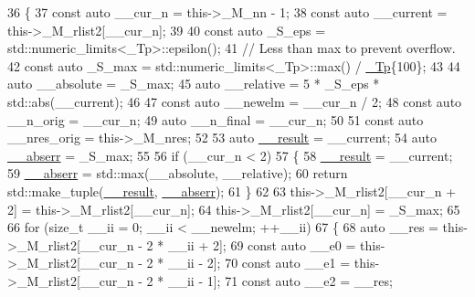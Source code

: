 \begin{DoxyCode}
36     \{
37       \textcolor{keyword}{const} \textcolor{keyword}{auto} \_\_cur\_n = this->\_M\_nn - 1;
38       \textcolor{keyword}{const} \textcolor{keyword}{auto} \_\_current = this->\_M\_rlist2[\_\_cur\_n];
39 
40       \textcolor{keyword}{const} \textcolor{keyword}{auto} \_S\_eps = std::numeric\_limits<\_Tp>::epsilon();
41       \textcolor{comment}{// Less than max to prevent overflow.}
42       \textcolor{keyword}{const} \textcolor{keyword}{auto} \_S\_max = std::numeric\_limits<\_Tp>::max() / \hyperlink{namespace____gnu__cxx_a3b19a9c800ca194374ef9172290f7d79}{\_Tp}\{100\};
43 
44       \textcolor{keyword}{auto} \_\_absolute = \_S\_max;
45       \textcolor{keyword}{auto} \_\_relative = 5 * \_S\_eps * std::abs(\_\_current);
46 
47       \textcolor{keyword}{const} \textcolor{keyword}{auto} \_\_newelm = \_\_cur\_n / 2;
48       \textcolor{keyword}{const} \textcolor{keyword}{auto} \_\_n\_orig = \_\_cur\_n;
49       \textcolor{keyword}{auto} \_\_n\_final = \_\_cur\_n;
50 
51       \textcolor{keyword}{const} \textcolor{keyword}{auto} \_\_nres\_orig = this->\_M\_nres;
52 
53       \textcolor{keyword}{auto} \hyperlink{namespace____gnu__cxx_a500ea9f53aeaecd8c2ae657503450578}{\_\_result} = \_\_current;
54       \textcolor{keyword}{auto} \hyperlink{namespace____gnu__cxx_a72f736cff127f1574e91a301de9e074b}{\_\_abserr} = \_S\_max;
55 
56       \textcolor{keywordflow}{if} (\_\_cur\_n < 2)
57         \{
58           \hyperlink{namespace____gnu__cxx_a500ea9f53aeaecd8c2ae657503450578}{\_\_result} = \_\_current;
59           \hyperlink{namespace____gnu__cxx_a72f736cff127f1574e91a301de9e074b}{\_\_abserr} = std::max(\_\_absolute, \_\_relative);
60           \textcolor{keywordflow}{return} std::make\_tuple(\hyperlink{namespace____gnu__cxx_a500ea9f53aeaecd8c2ae657503450578}{\_\_result}, \hyperlink{namespace____gnu__cxx_a72f736cff127f1574e91a301de9e074b}{\_\_abserr});
61         \}
62 
63       this->\_M\_rlist2[\_\_cur\_n + 2] = this->\_M\_rlist2[\_\_cur\_n];
64       this->\_M\_rlist2[\_\_cur\_n] = \_S\_max;
65 
66       \textcolor{keywordflow}{for} (\textcolor{keywordtype}{size\_t} \_\_ii = 0; \_\_ii < \_\_newelm; ++\_\_ii)
67         \{
68           \textcolor{keyword}{auto} \_\_res = this->\_M\_rlist2[\_\_cur\_n - 2 * \_\_ii + 2];
69           \textcolor{keyword}{const} \textcolor{keyword}{auto} \_\_e0 = this->\_M\_rlist2[\_\_cur\_n - 2 * \_\_ii - 2];
70           \textcolor{keyword}{const} \textcolor{keyword}{auto} \_\_e1 = this->\_M\_rlist2[\_\_cur\_n - 2 * \_\_ii - 1];
71           \textcolor{keyword}{const} \textcolor{keyword}{auto} \_\_e2 = \_\_res;

\end{DoxyCode}
